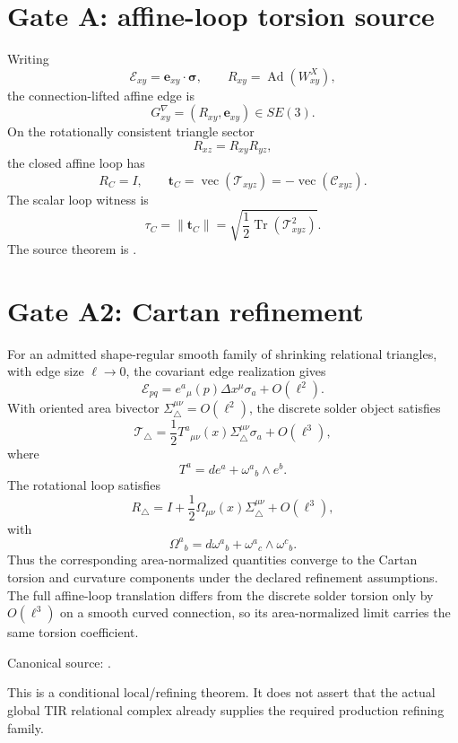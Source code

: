 \section{Gate A: affine-loop torsion source}

Writing
\[
\mathcal E_{xy}=\mathbf e_{xy}\cdot\boldsymbol\sigma,
\qquad
R_{xy}=\operatorname{Ad}(W_{xy}^{X}),
\]
the connection-lifted affine edge is
\[
\boxed{G_{xy}^{\nabla}=(R_{xy},\mathbf e_{xy})\in SE(3)}.
\]
On the rotationally consistent triangle sector
\[
R_{xz}=R_{xy}R_{yz},
\]
the closed affine loop has
\[
\boxed{R_C=I},
\qquad
\boxed{
\mathbf t_C
=\operatorname{vec}(\mathcal T_{xyz})
=-\operatorname{vec}(\mathcal C_{xyz}).
}
\]
The scalar loop witness is
\[
\boxed{
\tau_C
=\|\mathbf t_C\|
=\sqrt{\frac12\operatorname{Tr}(\mathcal T_{xyz}^2)}.
}
\]
The source theorem is
.

\section{Gate A2: Cartan refinement}

For an admitted shape-regular smooth family of shrinking relational triangles,
with edge size \(\ell\to0\), the covariant edge realization gives
\[
\mathcal E_{pq}
=e^a{}_{\mu}(p)\Delta x^{\mu}\sigma_a+O(\ell^2).
\]
With oriented area bivector \(\Sigma^{\mu\nu}_{\triangle}=O(\ell^2)\),
the discrete solder object satisfies
\[
\boxed{
\mathcal T_{\triangle}
=\frac12T^a{}_{\mu\nu}(x)
\Sigma^{\mu\nu}_{\triangle}\sigma_a
+O(\ell^3),
}
\]
where
\[
\boxed{T^a=de^a+\omega^a{}_b\wedge e^b}.
\]
The rotational loop satisfies
\[
\boxed{
R_{\triangle}
=I+\frac12\Omega_{\mu\nu}(x)
\Sigma^{\mu\nu}_{\triangle}+O(\ell^3),
}
\]
with
\[
\boxed{
\Omega^a{}_b
=d\omega^a{}_b+\omega^a{}_c\wedge\omega^c{}_b.
}
\]
Thus the corresponding area-normalized quantities converge to the Cartan
torsion and curvature components under the declared refinement assumptions.
The full affine-loop translation differs from the discrete solder torsion only
by \(O(\ell^3)\) on a smooth curved connection, so its area-normalized limit
carries the same torsion coefficient.

Canonical source:
.

This is a conditional local/refining theorem.  It does not assert that the
actual global TIR relational complex already supplies the required production
refining family.

